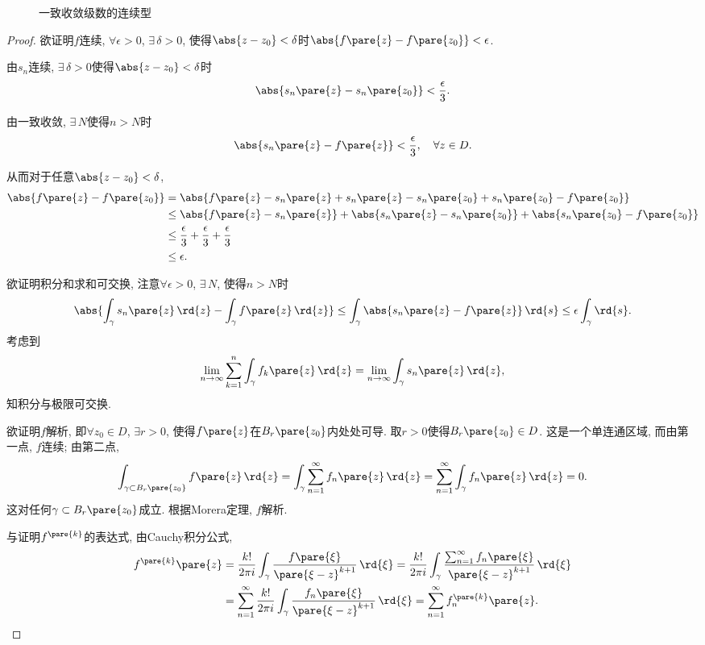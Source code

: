\documentclass[../ComplexVariable.tex]{subfiles}
\begin{document}
\begin{figure}[ht]
    \centering
    \caption{一致收敛级数的连续型}
\end{figure}
\begin{proof}
    欲证明$f$连续, $\forall \epsilon > 0$, $\exists\,\delta > 0$, 使得$\abs{z-z_0}<\delta$时$\abs{f\pare{z} - f\pare{z_0}}<\epsilon$.
    \begin{cenum}
        \item 由$s_n$连续, $\exists\, \delta>0$使得$\abs{z-z_0}<\delta$时
        \[ \abs{s_n\pare{z} - s_n\pare{z_0}} < \frac{\epsilon}{3}. \]
        \item 由一致收敛, $\exists\, N$使得$n>N$时
        \[ \abs{s_n\pare{z} - f\pare{z}} < \frac{\epsilon}{3},\quad \forall z\in D. \]
        \item 从而对于任意$\abs{z-z_0}<\delta$,
        \begin{align*}
            \abs{f\pare{z} - f\pare{z_0}} &= \abs{f\pare{z} - s_n\pare{z} + s_n\pare{z} - s_n\pare{z_0} + s_n\pare{z_0} - f\pare{z_0}} \\
            &\le \abs{f\pare{z}  -s_n\pare{z}} + \abs{s_n\pare{z} - s_n\pare{z_0}} + \abs{s_n\pare{z_0} - f\pare{z_0}} \\
            &\le \frac{\epsilon}{3} + \frac{\epsilon}{3} + \frac{\epsilon}{3} \\
            &\le \epsilon.
        \end{align*}
    \end{cenum}
    \par
    欲证明积分和求和可交换, 注意$\forall \epsilon>0$, $\exists\, N$, 使得$n>N$时 
    \[ \abs{\int_\gamma s_n\pare{z}\,\rd{z} - \int_\gamma f\pare{z}\,\rd{z}} \le \int_\gamma \abs{s_n\pare{z} - f\pare{z}}\,\rd{s} \le \epsilon \int_\gamma\rd{s}. \]
    考虑到
    \[ \lim_{n\rightarrow\infty} \sum_{k=1}^n \int_\gamma f_k\pare{z}\,\rd{z} = \lim_{n\rightarrow\infty}\int_\gamma s_n\pare{z}\,\rd{z}, \]
    知积分与极限可交换.
    \par
    欲证明$f$解析, 即$\forall z_0 \in D$, $\exists r>0$, 使得$f\pare{z}$在$B_r\pare{z_0}$内处处可导. 取$r>0$使得$B_r\pare{z_0} \in D$. 这是一个单连通区域, 而由第一点, $f$连续; 由第二点,
    \[ \int_{\gamma \subset B_r\pare{z_0}}f\pare{z}\,\rd{z} = \int_\gamma \sum_{n=1}^\infty f_n\pare{z}\,\rd{z} = \sum_{n=1}^\infty \int_\gamma f_n\pare{z}\,\rd{z} = 0. \]
    这对任何$\gamma\subset B_r\pare{z_0}$成立. 根据Morera定理, $f$解析.
    \par
    与证明$f^{\pare{k}}$的表达式, 由Cauchy积分公式,
    \begin{align*}
        f^{\pare{k}}\pare{z} &= \frac{k!}{2\pi i} \int_\gamma \frac{f\pare{\xi}}{\pare{\xi - z}^{k+1}}\,\rd{\xi} = \frac{k!}{2\pi i} \int_\gamma \frac{\sum_{n=1}^\infty f_n\pare{\xi}}{\pare{\xi - z}^{k+1}}\,\rd{\xi} \\
        &= \sum_{n=1}^\infty \frac{k!}{2\pi i} \int_\gamma \frac{f_n\pare{\xi}}{\pare{\xi - z}^{k+1}}\,\rd{\xi} = \sum_{n=1}^\infty f_n^{\pare{k}}\pare{z}. \qedhere
    \end{align*}
\end{proof}
\end{document}
